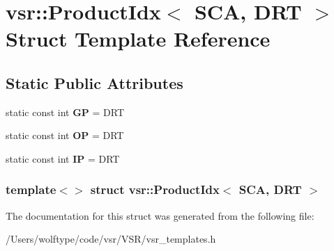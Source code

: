 \hypertarget{structvsr_1_1_product_idx_3_01_s_c_a_00_01_d_r_t_01_4}{\section{vsr\-:\-:Product\-Idx$<$ S\-C\-A, D\-R\-T $>$ Struct Template Reference}
\label{structvsr_1_1_product_idx_3_01_s_c_a_00_01_d_r_t_01_4}
}
\subsection*{Static Public Attributes}
\begin{DoxyCompactItemize}
\item 
\hypertarget{structvsr_1_1_product_idx_3_01_s_c_a_00_01_d_r_t_01_4_aa98caaafa6b67d81cf4341df9806b866}{static const int {\bfseries G\-P} = D\-R\-T}\label{structvsr_1_1_product_idx_3_01_s_c_a_00_01_d_r_t_01_4_aa98caaafa6b67d81cf4341df9806b866}

\item 
\hypertarget{structvsr_1_1_product_idx_3_01_s_c_a_00_01_d_r_t_01_4_af4908bfa9018c3affacf95a0b53d4ad6}{static const int {\bfseries O\-P} = D\-R\-T}\label{structvsr_1_1_product_idx_3_01_s_c_a_00_01_d_r_t_01_4_af4908bfa9018c3affacf95a0b53d4ad6}

\item 
\hypertarget{structvsr_1_1_product_idx_3_01_s_c_a_00_01_d_r_t_01_4_a47cc7cb3e97ee7dde644363ac7f7dc5e}{static const int {\bfseries I\-P} = D\-R\-T}\label{structvsr_1_1_product_idx_3_01_s_c_a_00_01_d_r_t_01_4_a47cc7cb3e97ee7dde644363ac7f7dc5e}

\end{DoxyCompactItemize}
\subsubsection*{template$<$$>$ struct vsr\-::\-Product\-Idx$<$ S\-C\-A, D\-R\-T $>$}



The documentation for this struct was generated from the following file\-:\begin{DoxyCompactItemize}
\item 
/\-Users/wolftype/code/vsr/\-V\-S\-R/vsr\-\_\-templates.\-h\end{DoxyCompactItemize}
